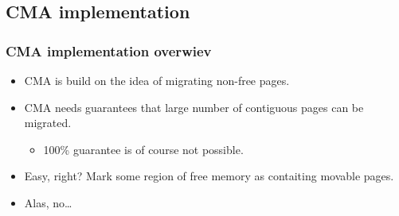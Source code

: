 \subsection{CMA implementation}

\begin{frame}
  \frametitle{CMA implementation overwiev}

  \begin{itemize}
  \item CMA is build on the idea of migrating non-free pages.
  \item CMA needs guarantees that large number of contiguous pages can
    be migrated.
    \begin{itemize}
    \item 100\% guarantee is of course not possible.
    \end{itemize}
  \item Easy, right? Mark some region of free memory as contaiting
    movable pages.
  \item Alas, no\ldots
  \end{itemize}
\end{frame}
